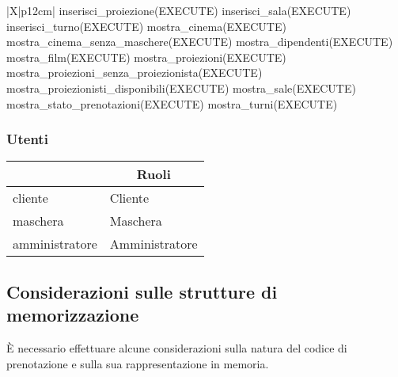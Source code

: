 \begin{tabularx}{\linewidth}{|X|p{12cm}|}
    inserisci\_proiezione(EXECUTE) \linebreak
    inserisci\_sala(EXECUTE) \linebreak
    inserisci\_turno(EXECUTE) \linebreak
    mostra\_cinema(EXECUTE) \linebreak
    mostra\_cinema\_senza\_maschere(EXECUTE) \linebreak
    mostra\_dipendenti(EXECUTE) \linebreak
    mostra\_film(EXECUTE) \linebreak
    mostra\_proiezioni(EXECUTE) \linebreak
    mostra\_proiezioni\_senza\_proiezionista(EXECUTE) \linebreak
    mostra\_proiezionisti\_disponibili(EXECUTE) \linebreak
    mostra\_sale(EXECUTE) \linebreak
    mostra\_stato\_prenotazioni(EXECUTE) \linebreak
    mostra\_turni(EXECUTE)
    \\\hline
\end{tabularx}

\subsubsection*{Utenti}

\begin{tabularx}{\linewidth}{|X|X|}
    \hline
    \rowcolor{tblhdrcolor}
    \multicolumn{1}{|c|}{\textbf{Nome}}
                   & \multicolumn{1}{|c|}{\textbf{Ruoli}}
    \\\hline
    cliente        & Cliente                              \\\hline
    maschera       & Maschera                             \\\hline
    amministratore & Amministratore                       \\\hline
\end{tabularx}

\pagebreak

\subsection*{Considerazioni sulle strutture di memorizzazione}

È necessario effettuare alcune considerazioni sulla natura del codice di
prenotazione e sulla sua rappresentazione in memoria.

